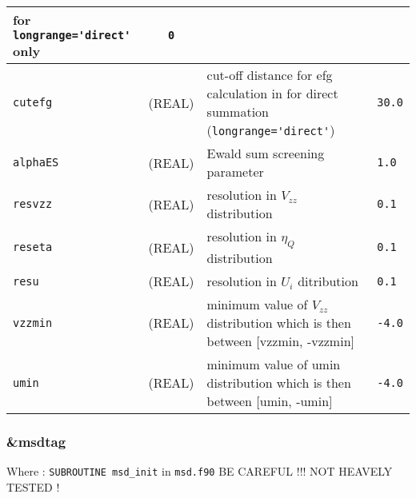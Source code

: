 \documentclass[a4paper]{article}
\begin{document}
\begin{longtable}{l|c|m{8cm}|m{2cm}}
                                              for \verb?longrange='direct'?  only \newline                                         & \verb?0? \\
\hline
\rule[-0.75cm]{0cm}{1.5cm}
\verb?cutefg?          & (REAL)             & cut-off distance for efg calculation in for direct summation 
                                              (\verb?longrange='direct'?) & \verb?30.0? \\
\hline
\rule[-0.75cm]{0cm}{1.5cm}
\verb?alphaES?         & (REAL)             & Ewald sum screening parameter                                                        & \verb?1.0? \\
\hline
\rule[-0.75cm]{0cm}{1.5cm}
\verb?resvzz?          & (REAL)             & resolution in $V_{zz}$ distribution                                                       & \verb?0.1? \\
\hline
\rule[-0.75cm]{0cm}{1.5cm}
\verb?reseta?          & (REAL)             & resolution in $\eta_Q$ distribution                                                       & \verb?0.1? \\
\hline
\rule[-0.75cm]{0cm}{1.5cm}
\verb?resu?            & (REAL)             & resolution in $U_i$ ditribution                                                         & \verb?0.1? \\
\hline
\rule[-0.75cm]{0cm}{1.5cm}
\verb?vzzmin?          & (REAL)             & minimum value of $V_{zz}$ distribution which is then between [vzzmin, -vzzmin]            & \verb?-4.0? \\ 
\hline
\rule[-0.75cm]{0cm}{1.5cm}
\verb?umin?            & (REAL)             & minimum value of umin distribution which is then between [umin, -umin]               & \verb?-4.0? \\
\hline
\hline
\end{longtable}


\subsubsection{\&msdtag}

Where : \verb?SUBROUTINE msd_init? in \verb?msd.f90?
BE CAREFUL !!! NOT HEAVELY TESTED !
\newline
\end{document}
